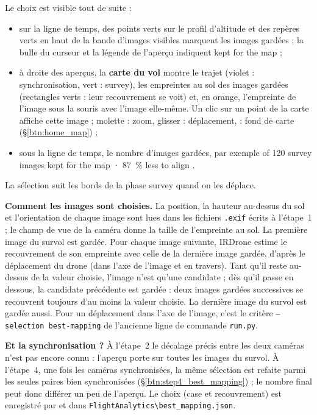 \documentclass[a4paper,11pt]{report}
\DeclareRobustCommand{\bouton}[1]{\texorpdfstring{\fbox{\small\textsf{#1}}}{#1}}
\begin{document}
Le choix est visible tout de suite :
\begin{itemize}
	\item sur la ligne de temps, des points verts sur le profil d'altitude et des repères verts en haut de la bande d'images visibles marquent les images gardées ; la bulle du curseur et la légende de l'aperçu indiquent \og kept for the map \fg ;
	\item à droite des aperçus, la \textbf{carte du vol} montre le trajet (violet : synchronisation, vert : survey), les empreintes au sol des images gardées (rectangles verts : leur recouvrement se voit) et, en orange, l'empreinte de l'image sous la souris avec l'image elle-même. Un clic sur un point de la carte affiche cette image ; molette : zoom, glisser : déplacement, \bouton{Layers} : fond de carte (§\ref{btn:home_map}) ;
	\item sous la ligne de temps, le nombre d'images gardées, par exemple  of 120 survey images kept for the map · 87~\% less to align \fg.
\end{itemize}
La sélection suit les bords de la phase survey quand on les déplace.

\textbf{Comment les images sont choisies.} La position, la hauteur au-dessus du sol et l'orientation de chaque image sont lues dans les fichiers \texttt{.exif} écrits à l'étape~1 ; le champ de vue de la caméra donne la taille de l'empreinte au sol. La première image du survol est gardée. Pour chaque image suivante, IRDrone estime le recouvrement de son empreinte avec celle de la dernière image gardée, d'après le déplacement du drone (dans l'axe de l'image et en travers). Tant qu'il reste au-dessus de la valeur choisie, l'image n'est qu'une candidate ; dès qu'il passe en dessous, la candidate précédente est gardée : deux images gardées successives se recouvrent toujours d'au moins la valeur choisie. La dernière image du survol est gardée aussi. Pour un déplacement dans l'axe de l'image, c'est le critère \texttt{--selection best-mapping} de l'ancienne ligne de commande \texttt{run.py}.

\textbf{Et la synchronisation ?} À l'étape~2 le décalage précis entre les deux caméras n'est pas encore connu : l'aperçu porte sur toutes les images du survol. À l'étape~4, une fois les caméras synchronisées, la même sélection est refaite parmi les seules paires bien synchronisées (§\ref{btn:step4_best_mapping}) ; le nombre final peut donc différer un peu de l'aperçu. Le choix (case et recouvrement) est enregistré par \bouton{Continue with synchronisation} et \bouton{Close} dans \texttt{FlightAnalytics\textbackslash best\_mapping.json}.
\end{document}
